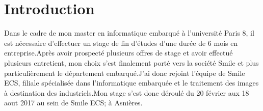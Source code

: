 \chapter*{Introduction}

Dans le cadre de mon master en informatique embarqué à l'université Paris 8, il est nécessaire d’effectuer un stage de fin d’études d’une durée de 6 mois en entreprise.Après avoir prospecté plusieurs offres de stage et avoir effectué plusieurs entretient, mon choix s’est finalement porté vers la société Smile et plus particulièrement le département embarqué.J’ai donc rejoint l'équipe de Smile ECS, filiale spécialisée dans l’informatique embarquée et le traitement des images à destination des industriels.Mon stage s’est donc déroulé du 20 février aux 18 aout 2017 au sein de Smile ECS; à Asnières.